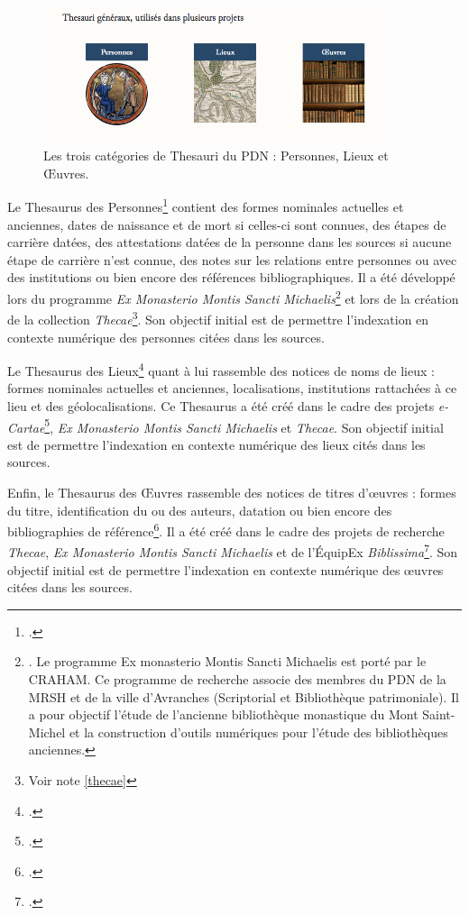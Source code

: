 \documentclass[a4paper,12pt,twoside]{book}
\begin{document}
\begin{figure}[H]
    \centering
    \includegraphics[width=10cm]{img/thesauris/thesau_generaux.png}
    \caption[Les trois catégories de Thesauri du \acrshort{PDN} : Personnes, Lieux et \OE{}uvres]{Les trois catégories de Thesauri du \acrshort{PDN} : Personnes, Lieux et \OE{}uvres.\footnotemark}
\end{figure}


Le Thesaurus des Personnes\footcite{thesau_pers} contient des \og formes nominales actuelles et anciennes, dates de naissance et de mort si celles-ci sont connues, des étapes de carrière datées, des attestations datées de la personne dans les sources si aucune étape de carrière n'est connue, des notes sur les relations entre personnes ou avec des institutions ou bien encore des références bibliographiques\fg. Il a été développé lors du programme \textit{Ex Monasterio Montis Sancti Michaelis}\footnote{\cite{monasterio}. Le programme Ex monasterio Montis Sancti Michaelis est porté par le CRAHAM. Ce programme de recherche associe des membres du \acrshort{PDN} de la \acrshort{MRSH} et de la ville d'Avranches (Scriptorial et Bibliothèque patrimoniale). Il a pour objectif l'étude de l'ancienne bibliothèque monastique du Mont Saint-Michel et la construction d'outils numériques pour l'étude des bibliothèques anciennes.} et lors de la création de la collection \textit{Thecae}\footnote{Voir note \ref{thecae}}. Son objectif initial est de permettre l'indexation en contexte numérique des personnes citées dans les sources.


Le Thesaurus des Lieux\footcite{thesau_lieu} quant à lui rassemble \og des notices de noms de lieux : formes nominales actuelles et anciennes, localisations, institutions rattachées à ce lieu et des géolocalisations\fg. Ce Thesaurus a été créé dans le cadre des projets \textit{e-Cartae}\footcite{ecartae}, \textit{Ex Monasterio Montis Sancti Michaelis} et \textit{Thecae}. Son objectif initial est de permettre l'indexation en contexte numérique des lieux cités dans les sources.

Enfin, le Thesaurus des \OE{}uvres rassemble \og des notices de titres d'\oe{}uvres : formes du titre, identification du ou des auteurs, datation ou bien encore des bibliographies de référence\fg\footcite{thesau_oeuvre}. Il a été créé dans le cadre des projets de recherche \textit{Thecae}, \textit{Ex Monasterio Montis Sancti Michaelis} et de l'ÉquipEx \textit{Biblissima}\footcite{Biblissima}. Son objectif initial est de permettre l'indexation en contexte numérique des \oe{}uvres citées dans les sources.
\end{document}
